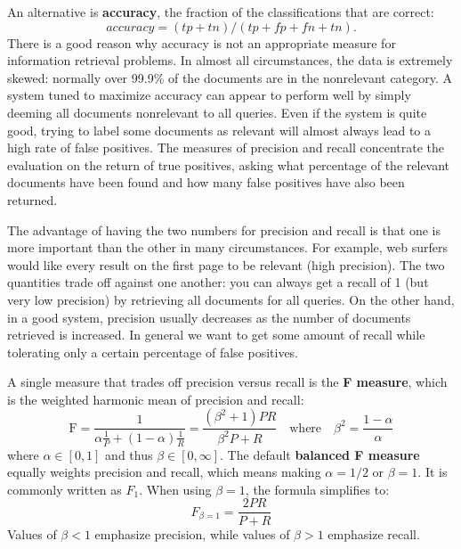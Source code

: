 \documentclass[letterpaper,11pt]{article}
\begin{document}
An alternative is \textbf{accuracy}, the fraction of the classifications that are correct: 
\[
accuracy = (tp + tn)/(tp + fp + fn + tn).
\]
There is a good reason why accuracy is not an appropriate measure for information retrieval problems. In almost all circumstances, the data is extremely skewed: normally over 99.9\% of the documents are in the nonrelevant category. A system tuned to maximize accuracy can appear to perform well by simply deeming all documents nonrelevant to all queries. Even if the system is quite good, trying to label some documents as relevant will almost always lead to a high rate of false positives. The measures of precision and recall concentrate the evaluation on the return of true positives, asking what percentage of the relevant documents have been found and how many false positives have also been returned.

The advantage of having the two numbers for precision and recall is that one is more important than the other in many circumstances. For example, web surfers would like every result on the first page to be relevant (high precision). The two quantities trade off against one another: you can always get a recall of 1 (but very low precision) by retrieving all documents for all queries. On the other hand, in a good system, precision usually decreases as the number of documents retrieved is increased. In general we want to get some amount of recall while tolerating only a certain percentage of false positives.

A single measure that trades off precision versus recall is the \textbf{F measure}, which is the weighted harmonic mean of precision and recall:
\[
\textrm{F} = \frac{1}{\alpha \frac{1}{P} + (1 - \alpha) \frac{1}{R}} = \frac{(\beta^2 + 1)PR}{\beta^2P + R} \quad \textrm{where} \quad \beta^2 = \frac{1 - \alpha}{\alpha}
\]
where $\alpha \in [0,1]$ and thus $\beta \in [0, \infty]$. The default\textbf{ balanced F measure} equally weights precision and recall, which means making $\alpha = 1/2$ or $\beta = 1$. It is commonly written as $F_1$. When using $\beta = 1$, the formula simplifies to:
\[
F_{\beta=1} = \frac{2PR}{P + R}
\]
Values of $\beta < 1$ emphasize precision, while values of $\beta > 1$ emphasize recall.
\end{document}
